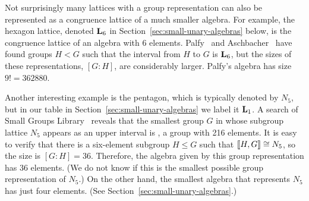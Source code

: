 
\begin{comment}
We call a (finite) lattice \defn{group representable} if 
it is isomorphic to an interval in the subgroup lattice of a (finite) group.
That is, $L$ is group representable if there exist groups $H \leq G$
such that $L$ is isomorphic to the interval
\begin{equation}
  \label{eq:1}
\lb H, G\rb := \{K \mid H \leq K \leq G\}.
\end{equation}
In this case, we call $\lb H, G\rb$ a \defn{group representation of} $L$.
We take the \defn{size} of a group representation to be
the index $[G:H]$, since this is the size of the algebra $\bA = \<G/H, G\>$ that has
congruence lattice $\Con(\bA) \cong L$.
\end{comment}

Not surprisingly many lattices with a group representation
can also be represented as a congruence lattice of a much smaller
algebra. For example, the hexagon lattice, denoted $\mathbf{L}_6$ in
Section~\ref{sec:small-unary-algebras} below, is the congruence lattice
of an algebra with 6 elements. Palfy~\cite{Palfy1988} and
Aschbacher~\cite{Aschbacher2008} have found groups
$H < G$ such that the interval from $H$ to $G$ is $\mathbf{L}_6$, but 
the sizes of these representations, 
$[G : H]$, are considerably larger. 
Palfy's algebra has size $9! = 362880$.

Another interesting example is the pentagon, which is typically denoted by
$N_5$, but in our table in Section~\ref{sec:small-unary-algebras} we
label it $\mathbf{L}_1$.  A search of \gaps Small Groups Library~\cite{GAP4}
reveals that the smallest group $G$ in whose subgroup lattice
$N_5$ appears as an upper interval is , 
a group with 216 elements. It is easy
to verify that there is a six-element subgroup $H\leq G$ such that
$\llbracket H, G\rrbracket \cong N_5$, so the size is $[G:H]= 36$. Therefore,
the algebra given by this group representation has 36 elements.
(We do not know if this is the smallest possible group representation of $N_5$.)
On the other hand, the smallest algebra that represents $N_5$ has just four elements.
(See Section~\ref{sec:small-unary-algebras}.)


